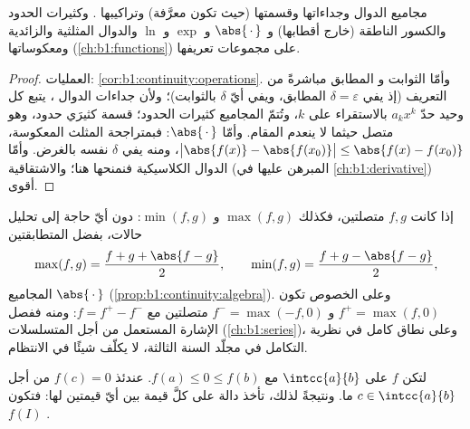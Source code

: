 \begin{proposition}\label{prop:b1:continuity:algebra}
مجاميع الدوال  وجداءاتها وقسمتها (حيث تكون معرَّفة) وتراكيبها
. وكثيرات الحدود والكسور الناطقة
(خارج أقطابها) و $\abs{\,\cdot\,}$ و $\exp$ و $\ln$ والدوال
المثلثية والزائدية ومعكوساتها
(\cref{ch:b1:functions})  على مجموعات تعريفها.
\end{proposition}

\begin{proof}
العمليات: \cref{cor:b1:continuity:operations}. وأمّا الثوابت و
 المطابق  مباشرةً من التعريف
(إذ يفي $\delta = \varepsilon$  المطابق، ويفي أيّ $\delta$
بالثوابت)؛ ولأن جداءات الدوال  ،
يتبع كل وحيد حدّ $a_k x^k$ بالاستقراء على $k$، وتُتمّ المجاميع
كثيرات الحدود؛  قسمة كثيرَي
حدود، وهو متصل حيثما لا ينعدم المقام.
وأمّا $\abs{\,\cdot\,}$: فبمتراجحة المثلث المعكوسة،
$\bigl|\abs{f(x)} - \abs{f(x_0)}\bigr| \leq \abs{f(x) -
f(x_0)}$، ومنه يفي $\delta$ نفسه بالغرض. وأمّا الدوال
الكلاسيكية فنمنحها  هنا؛ والاشتقاقية (المبرهن عليها في
\cref{ch:b1:derivative}) أقوى.
\end{proof}

\begin{example}\label{ex:b1:continuity:maxmin}
إذا كانت $f, g$ متصلتين، فكذلك $\max(f, g)$ و $\min(f, g)$:
دون أيّ حاجة إلى تحليل حالات، بفضل المتطابقتين
\[
\max(f, g) = \frac{f + g + \abs{f - g}}{2},
\qquad
\min(f, g) = \frac{f + g - \abs{f - g}}{2},
\]
 المجاميع  $\abs{\,\cdot\,}$
(\cref{prop:b1:continuity:algebra}). وعلى الخصوص تكون $f^+ =
\max(f, 0)$ و $f^- = \max(-f, 0)$ متصلتين مع $f =
f^+ - f^-$: ومنه ففصل الإشارة المستعمل من أجل المتسلسلات
(\cref{ch:b1:series})، وعلى نطاق كامل في نظرية
التكامل في مجلّد السنة الثالثة، لا يكلّف شيئًا في الانتظام.
\end{example}

\begin{theorem}\label{thm:b1:continuity:ivt}
لتكن $f$  على $\intcc{a}{b}$ مع $f(a) \leq 0 \leq
f(b)$. عندئذ $f(c) = 0$ من أجل $c \in \intcc{a}{b}$ ما.
ونتيجةً لذلك، تأخذ دالة  على  كلَّ قيمة
بين أيّ قيمتين لها: فتكون $f(I)$
.
\end{theorem}

